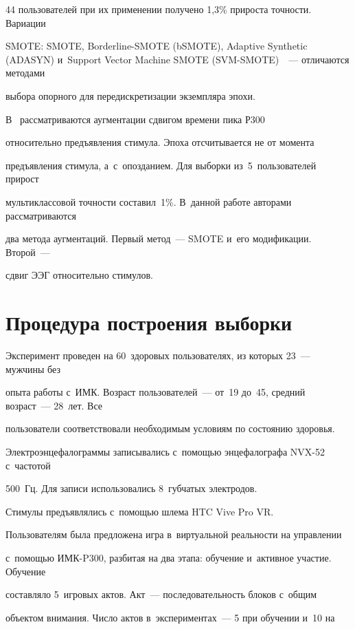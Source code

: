 44 пользователей при их применении получено 1,3\% прироста точности. Вариации 

SMOTE: SMOTE, Borderline-SMOTE (bSMOTE), Adaptive Synthetic (ADASYN) и~Support Vector Machine SMOTE (SVM-SMOTE)~\cite{imblearn}~--- отличаются методами 

выбора опорного для передискретизации экземпляра эпохи.

В~\cite{Krell2018DataAF} рассматриваются аугментации сдвигом времени пика Р300 

относительно предъявления стимула. Эпоха отсчитывается не от момента 

предъявления стимула, а~с~опозданием. Для выборки из~5~пользователей прирост 

мультиклассовой точности составил~1\%. В~данной работе авторами рассматриваются 

два метода аугментаций. Первый метод~--- SMOTE и~его модификации. Второй~--- 

сдвиг ЭЭГ относительно стимулов.



\section{Процедура построения выборки}



Эксперимент проведен на 60~здоровых пользователях, из которых 23~--- мужчины без 

опыта работы с~ИМК. Возраст пользователей~--- от~19 до~45, средний возраст~--- 28~лет. Все 

пользователи соответствовали необходимым условиям по состоянию здоровья.  

Электроэнцефалограммы записывались с~помощью энцефалографа NVX-52 с~частотой 

500~Гц. Для записи использовались 8~губчатых электродов. 

 Стимулы предъявлялись с~помощью шлема HTC Vive Pro VR.





Пользователям была предложена игра в~виртуальной реальности на управлении 

с~по\-мощью ИМК-P300, разбитая на два этапа: обучение и~активное участие. Обучение 

составляло 5~игровых актов. Акт~--- последовательность блоков с~общим 

объектом внимания. Число актов в~экспериментах~--- 5 при обучении и~10 на 

